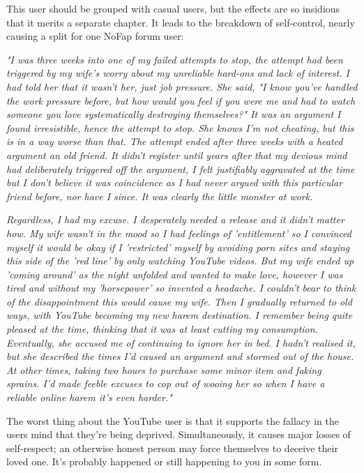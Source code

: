 \documentclass[easypeasy.tex]{subfiles}
\begin{document}
This user should be grouped with casual users, but the effects are so insidious that it merits a separate chapter. It leads to the breakdown of self-control, nearly causing a split for one NoFap forum user:

\textit{"I was three weeks into one of my failed attempts to stop, the attempt had been triggered by my wife's worry about my unreliable hard-ons and lack of interest. I had told her that it wasn't her, just job pressure. She said, "I know you've handled the work pressure before, but how would you feel if you were me and had to watch someone you love systematically destroying themselves?" It was an argument I found irresistible, hence the attempt to stop. She knows I'm not cheating, but this is in a way worse than that. The attempt ended after three weeks with a heated argument an old friend. It didn't register until years after that my devious mind had deliberately triggered off the argument, I felt justifiably aggravated at the time but I don't believe it was coincidence as I had never argued with this particular friend before, nor have I since. It was clearly the little monster at work.}

\textit{Regardless, I had my excuse. I desperately needed a release and it didn't matter how. My wife wasn't in the mood so I had feelings of 'entitlement' so I convinced myself it would be okay if I 'restricted' myself by avoiding porn sites and staying this side of the 'red line' by only watching YouTube videos. But my wife ended up 'coming around' as the night unfolded and wanted to make love, however I was tired and without my 'horsepower' so invented a headache. I couldn't bear to think of the disappointment this would cause my wife. Then I gradually returned to old ways, with YouTube becoming my new harem destination. I remember being quite pleased at the time, thinking that it was at least cutting my consumption. Eventually, she accused me of continuing to ignore her in bed. I hadn't realised it, but she described the times I'd caused an argument and stormed out of the house. At other times, taking two hours to purchase some minor item and faking sprains. I'd made feeble excuses to cop out of wooing her so when I have a reliable online harem it's even harder."}

The worst thing about the YouTube user is that it supports the fallacy in the users mind that they're being deprived. Simultaneously, it causes major losses of self-respect; an otherwise honest person may force themselves to deceive their loved one. It's probably happened or still happening to you in some form.
\end{document}
